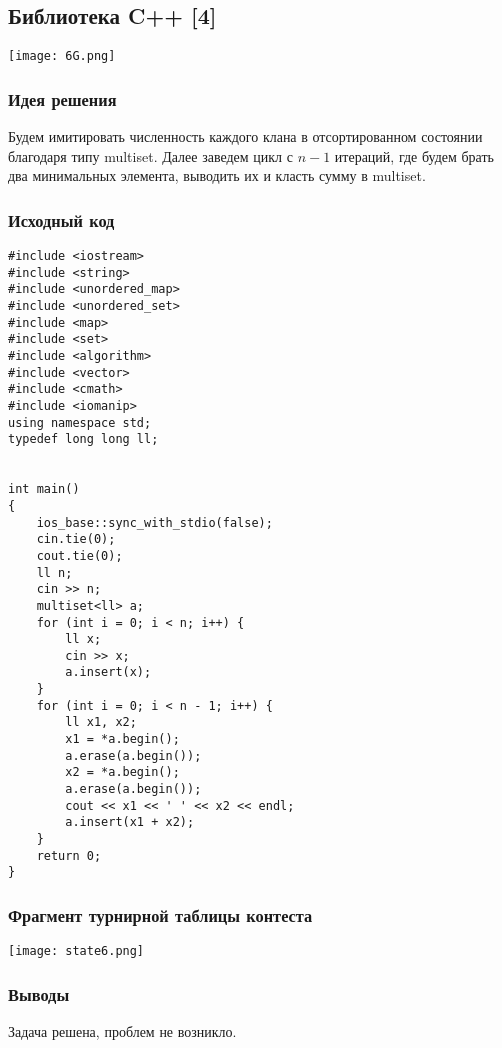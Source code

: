 \subsection*{Библиотека C++ [4]}
\begin{center}
\texttt{[image: 6G.png]}
\end{center}
\subsubsection*{Идея решения}
Будем имитировать численность каждого клана в отсортированном состоянии благодаря типу multiset. Далее заведем цикл с $n-1$ итераций, где будем брать два минимальных элемента, выводить их и класть сумму в multiset. 
\subsubsection*{Исходный код}
\begin{lstlisting}
#include <iostream>
#include <string>
#include <unordered_map>
#include <unordered_set>
#include <map>
#include <set>
#include <algorithm>
#include <vector>
#include <cmath>
#include <iomanip>
using namespace std;
typedef long long ll;


int main()
{
    ios_base::sync_with_stdio(false);
    cin.tie(0);
    cout.tie(0);
    ll n;
    cin >> n;
    multiset<ll> a;
    for (int i = 0; i < n; i++) {
        ll x;
        cin >> x;
        a.insert(x);
    }
    for (int i = 0; i < n - 1; i++) {
        ll x1, x2;
        x1 = *a.begin();
        a.erase(a.begin());
        x2 = *a.begin();
        a.erase(a.begin());
        cout << x1 << ' ' << x2 << endl;
        a.insert(x1 + x2);
    }
    return 0;
}
\end{lstlisting}
\subsubsection*{Фрагмент турнирной таблицы контеста}
\begin{center}
\texttt{[image: state6.png]}\newline\noindent
\end{center}

\subsubsection*{Выводы}
Задача решена, проблем не возникло.
